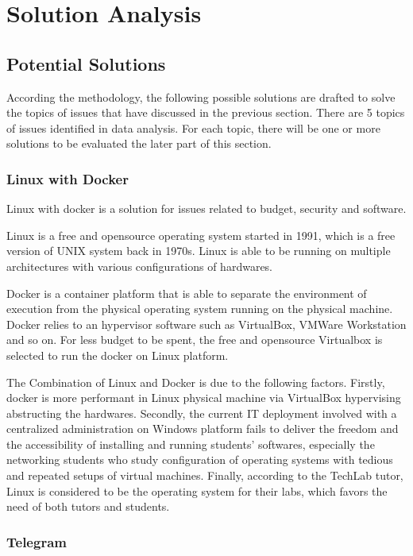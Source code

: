 
\section{Solution Analysis}

\subsection{Potential Solutions}

According the methodology, the following possible solutions are drafted to solve the topics of issues that have discussed in the previous section. There are 5 topics of issues identified in data analysis. For each topic, there will be one or more solutions to be evaluated the later part of this section.

\subsubsection{Linux with Docker}
Linux with docker is a solution for issues related to budget, security and software.

Linux is a free and opensource operating system started in 1991, which is a free version of UNIX system back in 1970s. Linux is able to be running on multiple architectures with various configurations of hardwares.

Docker is a container platform that is able to separate the environment of execution from the physical operating system running on the physical machine. Docker relies to an hypervisor software such as VirtualBox, VMWare Workstation and so on. For less budget to be spent, the free and opensource Virtualbox is selected to run the docker on Linux platform.

The Combination of Linux and Docker is due to the following factors. Firstly, docker is more performant in Linux physical machine via VirtualBox hypervising abstructing the hardwares. Secondly, the current IT deployment involved with a centralized administration on Windows platform fails to deliver the freedom  and the accessibility of installing and running students' softwares, especially the networking students who study configuration of operating systems with tedious and repeated setups of virtual machines. Finally, according to the TechLab tutor, Linux is considered to be the operating system for their labs, which favors the need of both tutors and students.

\subsubsection{Telegram}

